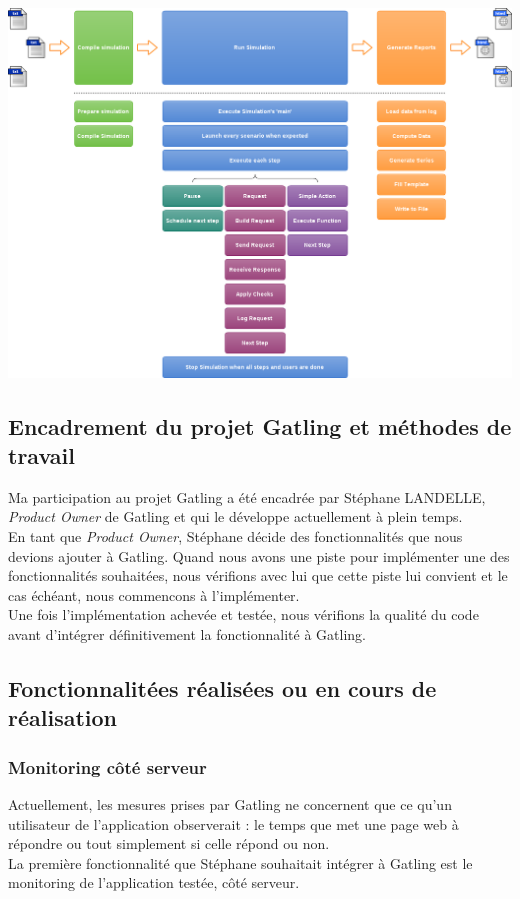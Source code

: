 \begin{center}
	\includegraphics[scale=0.3]{gatling-process.png}
\end{center}

\subsection{Encadrement du projet Gatling et méthodes de travail}

Ma participation au projet Gatling a été encadrée par Stéphane LANDELLE, \textit{Product Owner} de Gatling et qui le développe actuellement à plein temps.\\
En tant que \textit{Product Owner}, Stéphane décide des fonctionnalités que nous devions ajouter à Gatling. Quand nous avons une piste pour implémenter une des fonctionnalités souhaitées, nous vérifions avec lui que cette piste lui convient et le cas échéant, nous commencons à l'implémenter.\\
Une fois l'implémentation achevée et testée, nous vérifions la qualité du code avant d'intégrer définitivement la fonctionnalité à Gatling.
\subsection{Fonctionnalitées réalisées ou en cours de réalisation}

\subsubsection{Monitoring c\^oté serveur}

Actuellement, les mesures prises par Gatling ne concernent que ce qu'un utilisateur de l'application observerait : le temps que met une page web à répondre ou tout simplement si celle répond ou non.\\
La première fonctionnalité que Stéphane souhaitait intégrer à Gatling est le monitoring de l'application testée, c\^oté serveur.\\

